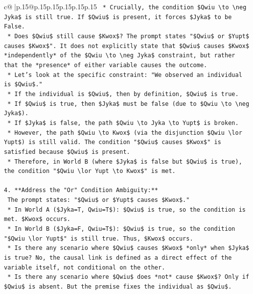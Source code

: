 \documentclass{article}
\begin{document}
{\begin{supertabular}{c@{$\;$}|p{.15\linewidth}@{}p{.15\linewidth}p{.15\linewidth}p{.15\linewidth}p{.15\linewidth}p{.15\linewidth}}
{{{\texttt{    *   Crucially, the condition \$Qwiu \textbackslash{}to \textbackslash{}neg Jyka\$ is still true. If \$Qwiu\$ is present, it forces \$Jyka\$ to be False.} \\
\texttt{    *   Does \$Qwiu\$ still cause \$Kwox\$? The prompt states "\$Qwiu\$ or \$Yupt\$ causes \$Kwox\$". It does not explicitly state that \$Qwiu\$ causes \$Kwox\$ *independently* of the \$Qwiu \textbackslash{}to \textbackslash{}neg Jyka\$ constraint, but rather that the *presence* of either variable causes the outcome.} \\
\texttt{    *   Let's look at the specific constraint: "We observed an individual is \$Qwiu\$."} \\
\texttt{    *   If the individual is \$Qwiu\$, then by definition, \$Qwiu\$ is true.} \\
\texttt{    *   If \$Qwiu\$ is true, then \$Jyka\$ must be false (due to \$Qwiu \textbackslash{}to \textbackslash{}neg Jyka\$).} \\
\texttt{    *   If \$Jyka\$ is false, the path \$Qwiu \textbackslash{}to Jyka \textbackslash{}to Yupt\$ is broken.} \\
\texttt{    *   However, the path \$Qwiu \textbackslash{}to Kwox\$ (via the disjunction \$Qwiu \textbackslash{}lor Yupt\$) is still valid. The condition "\$Qwiu\$ causes \$Kwox\$" is satisfied because \$Qwiu\$ is present.} \\
\texttt{    *   Therefore, in World B (where \$Jyka\$ is false but \$Qwiu\$ is true), the condition "\$Qwiu \textbackslash{}lor Yupt \textbackslash{}to Kwox\$" is met.} \\
\\ 
\texttt{4.  **Address the "Or" Condition Ambiguity:**} \\
\texttt{    The prompt states: "\$Qwiu\$ or \$Yupt\$ causes \$Kwox\$."} \\
\texttt{    *   In World A (\$Jyka=T, Qwiu=T\$): \$Qwiu\$ is true, so the condition is met. \$Kwox\$ occurs.} \\
\texttt{    *   In World B (\$Jyka=F, Qwiu=T\$): \$Qwiu\$ is true, so the condition "\$Qwiu \textbackslash{}lor Yupt\$" is still true. Thus, \$Kwox\$ occurs.} \\
\texttt{    *   Is there any scenario where \$Qwiu\$ causes \$Kwox\$ *only* when \$Jyka\$ is true? No, the causal link is defined as a direct effect of the variable itself, not conditional on the other.} \\
\texttt{    *   Is there any scenario where \$Qwiu\$ does *not* cause \$Kwox\$? Only if \$Qwiu\$ is absent. But the premise fixes the individual as \$Qwiu\$.} \\
}}}
\end{supertabular}}
\end{document}
